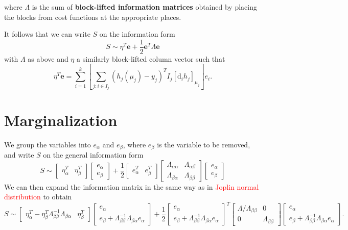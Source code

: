 where $\Lambda$ is the sum of \textbf{block-lifted information matrices} obtained by placing the blocks from cost functions at the appropriate places.

It follows that we can write $S$ on the information form
$$
  S \sim \eta^T \mathbf{e} + \frac{1}{2} \mathbf{e}^T \Lambda \mathbf{e}
$$
with $\Lambda$ as above and $\eta$ a similarly block-lifted column vector such that
$$
  \eta^T \mathbf{e} = \sum_{i=1}^k \left[ \sum_{j : i \in I_j} (h_j(\mu_j) - y_j)^T I_j [\mathrm{d}_i h_j]_{\mu_j} \right] e_i.
$$

\section{Marginalization}

We group the variables into $e_\alpha$ and $e_\beta$, where $e_\beta$ is the variable to be removed, and write $S$ on the general information form
$$
  S \sim \begin{bmatrix}
    \eta_\alpha^T & \eta_\beta^T
  \end{bmatrix}   \begin{bmatrix}
    e_\alpha \\ e_\beta
  \end{bmatrix} + \frac{1}{2}\begin{bmatrix}
    e_\alpha^T & e_\beta^T
  \end{bmatrix} \begin{bmatrix}
    \Lambda_{\alpha \alpha} & \Lambda_{\alpha \beta} \\ \Lambda_{\beta \alpha} & \Lambda_{\beta \beta}
  \end{bmatrix} \begin{bmatrix}
    e_\alpha \\ e_\beta
  \end{bmatrix} 
$$
We can then expand the information matrix in the same way as in \textcolor{red}{Joplin normal distribution} to obtain
$$
 S \sim \begin{bmatrix}
  \eta_\alpha^T - \eta_\beta^T \Lambda_{\beta \beta}^{-1} \Lambda_{\beta \alpha} & \eta_\beta^T
\end{bmatrix}   \begin{bmatrix}
  e_\alpha \\ e_\beta + \Lambda_{\beta\beta}^{-1} \Lambda_{\beta \alpha} e_\alpha
\end{bmatrix} + \frac{1}{2}\begin{bmatrix}
  e_\alpha \\ e_\beta + \Lambda_{\beta\beta}^{-1} \Lambda_{\beta \alpha} e_\alpha
\end{bmatrix}^T \begin{bmatrix}
  \Lambda/\Lambda_{\beta \beta} & 0 \\ 0 & \Lambda_{\beta \beta}
\end{bmatrix} \begin{bmatrix}
  e_\alpha \\ e_\beta + \Lambda_{\beta\beta}^{-1} \Lambda_{\beta \alpha} e_\alpha
\end{bmatrix}.
$$
